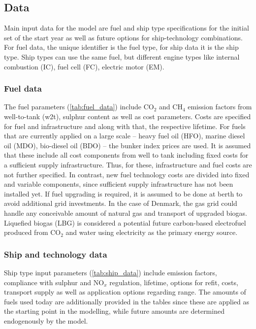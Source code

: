 \documentclass[article]{elsarticle}
\begin{document}
\glsdisablehyper
\glsaddall
\begin{table}[h]
\begin{mdframed}
\footnotesize{
\begin{multicols}{2}
\printglossary[style=tree,type=obj]
\end{multicols}
}
\end{mdframed}
\label{box:nomenclature_obj}
\end{table}



\subsection{Data}
\label{subsec:Dat}
Main input data for the model are fuel and ship type specifications for the initial set of the start year as well as future options for ship-technology combinations. For fuel data, the unique identifier is the fuel type, for ship data it is the ship type. Ship types can use the same fuel, but different engine types like internal combustion (IC), fuel cell (FC), electric motor (EM).

\subsubsection{Fuel data}
The fuel parameters (\autoref{tab:fuel_data}) include CO$_2$ and CH$_4$ emission factors from well-to-tank (w2t), sulphur content as well as cost parameters. Costs are specified for fuel and infrastructure and along with that, the respective lifetime. For fuels that are currently applied on a large scale -- heavy fuel oil (HFO), marine diesel oil (MDO), bio-diesel oil (BDO) -- the bunker index prices are used. It is assumed that these include all cost components from well to tank including fixed costs for a sufficient supply infrastructure. Thus, for these, infrastructure and fuel costs are not further specified. In contrast, new fuel technology costs are divided into fixed and variable components, since sufficient supply infrastructure has not been installed yet. If fuel upgrading is required, it is assumed to be done at berth to avoid additional grid investments. In the case of Denmark, the gas grid could handle any conceivable amount of natural gas and transport of upgraded biogas. Liquefied biogas (LBG) is considered a potential future carbon-based electrofuel produced from CO$_2$ and water using electricity as the primary energy source.


\subsubsection{Ship and technology data}
Ship type input parameters (\autoref{tab:ship_data}) include emission factors, compliance with sulphur and NO$_x$ regulation, lifetime, options for refit, costs, transport supply as well as application options regarding range. The amounts of fuels used today are additionally provided in the tables since these are applied as the starting point in the modelling, while future amounts are determined endogenously by the model.
\end{document}
